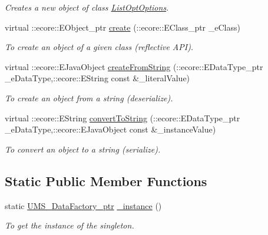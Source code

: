 \begin{DoxyCompactItemize}
\begin{DoxyCompactList}\small\item\em Creates a new object of class \hyperlink{classUMS__Data_1_1ListOptOptions}{ListOptOptions}. \item\end{DoxyCompactList}\item 
virtual ::ecore::EObject\_\-ptr \hyperlink{classUMS__Data_1_1UMS__DataFactory_a2762df5fab9c8a5be5864c5f5b4590ce}{create} (::ecore::EClass\_\-ptr \_\-eClass)
\begin{DoxyCompactList}\small\item\em To create an object of a given class (reflective API). \item\end{DoxyCompactList}\item 
virtual ::ecore::EJavaObject \hyperlink{classUMS__Data_1_1UMS__DataFactory_ab99f89e4aaaf3baa250818052abd959e}{createFromString} (::ecore::EDataType\_\-ptr \_\-eDataType,::ecore::EString const \&\_\-literalValue)
\begin{DoxyCompactList}\small\item\em To create an object from a string (deserialize). \item\end{DoxyCompactList}\item 
virtual ::ecore::EString \hyperlink{classUMS__Data_1_1UMS__DataFactory_ab17ec6caf3557e50c9506d4cacd2f418}{convertToString} (::ecore::EDataType\_\-ptr \_\-eDataType,::ecore::EJavaObject const \&\_\-instanceValue)
\begin{DoxyCompactList}\small\item\em To convert an object to a string (serialize). \item\end{DoxyCompactList}\end{DoxyCompactItemize}
\subsection*{Static Public Member Functions}
\begin{DoxyCompactItemize}
\item 
static \hyperlink{classUMS__Data_1_1UMS__DataFactory}{UMS\_\-DataFactory\_\-ptr} \hyperlink{classUMS__Data_1_1UMS__DataFactory_a73ad8709225ab46ad5ef5e172e0e8a0a}{\_\-instance} ()
\begin{DoxyCompactList}\small\item\em To get the instance of the singleton. \item\end{DoxyCompactList}\end{DoxyCompactItemize}

